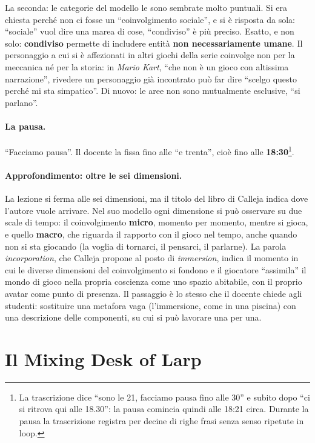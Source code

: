 La seconda: le categorie del modello le sono sembrate molto puntuali. Si era
chiesta perché non ci fosse un ``coinvolgimento sociale'', e si è risposta da
sola: ``sociale'' vuol dire una marea di cose, ``condiviso'' è più preciso.
Esatto, e non solo: \textbf{condiviso} permette di includere entità
\textbf{non necessariamente umane}. Il personaggio a cui si è affezionati in altri
giochi della serie coinvolge non per la meccanica né per la storia: in
\emph{Mario Kart}, ``che non è un gioco con altissima narrazione'', rivedere un
personaggio già incontrato può far dire ``scelgo questo perché mi sta
simpatico''. Di nuovo: le aree non sono mutualmente esclusive, ``si parlano''.

\paragraph{La pausa.} ``Facciamo pausa''. Il docente la fissa fino alle ``e
trenta'', cioè fino alle \textbf{18:30}\footnote{La trascrizione dice ``sono le
21, facciamo pausa fino alle 30'' e subito dopo ``ci si ritrova qui alle 18.30'':
la pausa comincia quindi alle 18:21 circa. Durante la pausa la trascrizione
registra per decine di righe frasi senza senso ripetute in loop.}.

\paragraph{Approfondimento: oltre le sei dimensioni.} La lezione si ferma alle
sei dimensioni, ma il titolo del libro di Calleja indica dove l'autore vuole
arrivare. Nel suo modello ogni dimensione si può osservare su due scale di
tempo: il coinvolgimento \textbf{micro}, momento per momento, mentre si gioca, e
quello \textbf{macro}, che riguarda il rapporto con il gioco nel tempo, anche
quando non si sta giocando (la voglia di tornarci, il pensarci, il parlarne). La
parola \emph{incorporation}, che Calleja propone al posto di
\emph{immersion}, indica il momento in cui le diverse dimensioni del
coinvolgimento si fondono e il giocatore ``assimila'' il mondo di gioco nella
propria coscienza come uno spazio abitabile, con il proprio avatar come punto
di presenza. Il passaggio è lo stesso che il docente chiede agli studenti:
sostituire una metafora vaga (l'immersione, come in una piscina) con una
descrizione delle componenti, su cui si può lavorare una per una.

\section{Il Mixing Desk of Larp}
\label{a3:sec:mixing}

